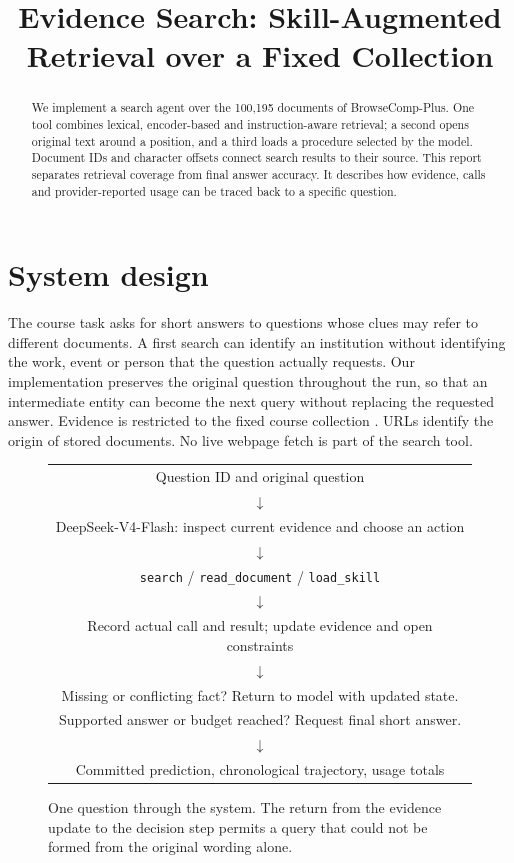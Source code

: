 \documentclass[sigconf]{acmart}
\begin{document}
\title{Evidence Search: Skill-Augmented Retrieval over a Fixed Collection}
\author{\ReportGroup}
\renewcommand{\shortauthors}{COMP5423 group project}
\begin{abstract}
We implement a search agent over the 100,195 documents of BrowseComp-Plus. One tool combines lexical, encoder-based and instruction-aware retrieval; a second opens original text around a position, and a third loads a procedure selected by the model. Document IDs and character offsets connect search results to their source. This report separates retrieval coverage from final answer accuracy. It describes how evidence, calls and provider-reported usage can be traced back to a specific question. \RunStatus
\end{abstract}
\maketitle
\section{System design}
The course task asks for short answers to questions whose clues may refer to different documents. A first search can identify an institution without identifying the work, event or person that the question actually requests. Our implementation preserves the original question throughout the run, so that an intermediate entity can become the next query without replacing the requested answer. Evidence is restricted to the fixed course collection \cite{browse}. URLs identify the origin of stored documents. No live webpage fetch is part of the search tool.

\begin{figure}[h]
\centering
\small\begin{tabular}{@{}c@{}}
\toprule
Question ID and original question\\
$\downarrow$\\
DeepSeek-V4-Flash: inspect current evidence and choose an action\\
$\downarrow$\\
\texttt{search} \quad / \quad \texttt{read\_document} \quad / \quad \texttt{load\_skill}\\
$\downarrow$\\
Record actual call and result; update evidence and open constraints\\
$\downarrow$\\
Missing or conflicting fact? Return to model with updated state.\\
Supported answer or budget reached? Request final short answer.\\
$\downarrow$\\
Committed prediction, chronological trajectory, usage totals\\
\bottomrule
\end{tabular}
\caption{One question through the system. The return from the evidence update to the decision step permits a query that could not be formed from the original wording alone.}
\end{figure}
\end{document}
